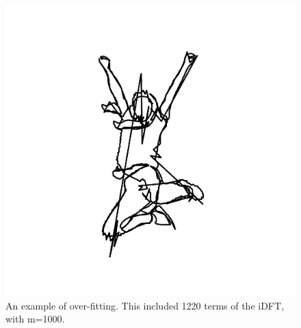 \documentclass[psamsfonts]{amsart}
\theoremstyle{definition}
\theoremstyle{remark}
\numberwithin{equation}{section}
\begin{document}
\begin{figure}[h!]
	\centering
	\includegraphics[scale=.2]{girl1220.png}
	\caption{An example of over-fitting. This included 1220 terms of the iDFT, with m=1000.}
\end{figure}
\end{document}
